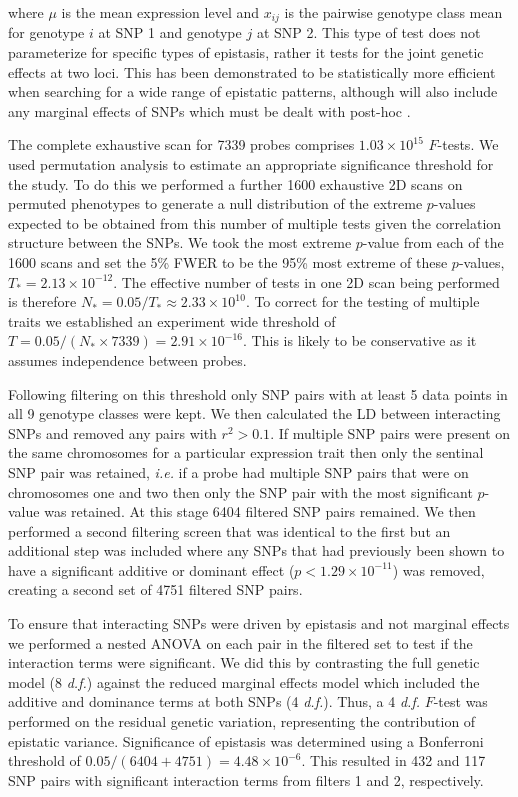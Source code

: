 \documentclass{article}
\begin{document}
where $\mu$ is the mean expression level and $x _{ij}$ is the pairwise genotype class mean for genotype $i$ at SNP 1 and genotype $j$ at SNP 2. This type of test does not parameterize for specific types of epistasis, rather it tests for the joint genetic effects at two loci. This has been demonstrated to be statistically more efficient when searching for a wide range of epistatic patterns, although will also include any marginal effects of SNPs which must be dealt with post-hoc \cite{Hemani2013}.
 
The complete exhaustive scan for 7339 probes comprises $1.03 \times 10^{15}$ $F$-tests. We used permutation analysis to estimate an appropriate significance threshold for the study. To do this we performed a further 1600 exhaustive 2D scans on permuted phenotypes to generate a null distribution of the extreme $p$-values expected to be obtained from this number of multiple tests given the correlation structure between the SNPs. We took the most extreme $p$-value from each of the 1600 scans and set the 5\% FWER to be the 95\% most extreme of these $p$-values, $T_{*} = 2.13 \times 10^{-12}$. The effective number of tests in one 2D scan being performed is therefore $N_{*} = 0.05 / T_{*} \approx 2.33 \times 10^{10}$. To correct for the testing of multiple traits we established an experiment wide threshold of $T = 0.05 / (N_{*} \times 7339) = 2.91 \times 10^{-16}$. This is likely to be conservative as it assumes independence between probes.

Following filtering on this threshold only SNP pairs with at least 5 data points in all 9 genotype classes were kept. We then calculated the LD between interacting SNPs and removed any pairs with $r^2 > 0.1$. If multiple SNP pairs were present on the same chromosomes for a particular expression trait then only the sentinal SNP pair was retained, \emph{i.e.} if a probe had multiple SNP pairs that were on chromosomes one and two then only the SNP pair with the most significant $p$-value was retained. At this stage 6404 filtered SNP pairs remained. We then performed a second filtering screen that was identical to the first but an additional step was included where any SNPs that had previously been shown to have a significant additive or dominant effect ($p < 1.29 \times 10^{-11}$) was removed, creating a second set of 4751 filtered SNP pairs.

To ensure that interacting SNPs were driven by epistasis and not marginal effects we performed a nested ANOVA on each pair in the filtered set to test if the interaction terms were significant. We did this by contrasting the full genetic model (8 \emph{d.f.}) against the reduced marginal effects model which included the additive and dominance terms at both SNPs (4 \emph{d.f.}). Thus, a 4 \emph{d.f.} $F$-test was performed on the residual genetic variation, representing the contribution of epistatic variance. Significance of epistasis was determined using a Bonferroni threshold of $0.05 / (6404+4751) = 4.48 \times 10^{-6}$. This resulted in 432 and 117 SNP pairs with significant interaction terms from filters 1 and 2, respectively.
\end{document}

